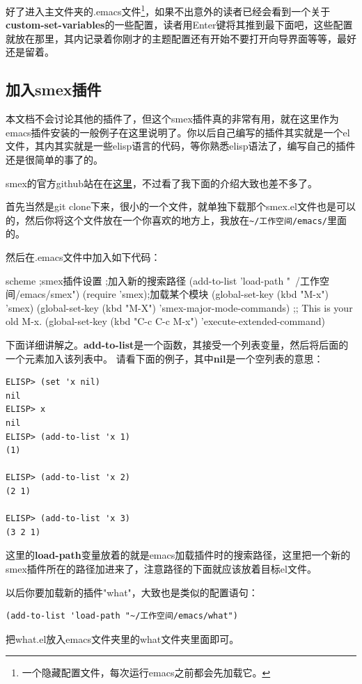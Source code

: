 \documentclass[11pt,oneside]{book}
\begin{document}
好了进入主文件夹的.emacs文件\footnote{一个隐藏配置文件，每次运行emacs之前都会先加载它。}，如果不出意外的读者已经会看到一个关于\textbf{custom-set-variables}的一些配置，读者用Enter键将其推到最下面吧，这些配置就放在那里，其内记录着你刚才的主题配置还有开始不要打开向导界面等等，最好还是留着。

\subsection{加入smex插件}
本文档不会讨论其他的插件了，但这个smex插件真的非常有用，就在这里作为emacs插件安装的一般例子在这里说明了。你以后自己编写的插件其实就是一个el文件，其内其实就是一些elisp语言的代码，等你熟悉elisp语法了，编写自己的插件还是很简单的事了的。

smex的官方github站在在\href{https://github.com/nonsequitur/smex/}{这里}，不过看了我下面的介绍大致也差不多了。

首先当然是git clone下来，很小的一个文件，就单独下载那个smex.el文件也是可以的，然后你将这个文件放在一个你喜欢的地方上，我放在\verb+~/工作空间/emacs/+里面的。

然后在.emacs文件中加入如下代码：
\begin{tcbcode}[]{scheme}
;smex插件设置
;加入新的搜索路径
(add-to-list 'load-path "~/工作空间/emacs/smex")
(require 'smex);加载某个模块
(global-set-key (kbd "M-x") 'smex)
(global-set-key (kbd "M-X") 'smex-major-mode-commands)
;; This is your old M-x.
(global-set-key (kbd "C-c C-c M-x") 'execute-extended-command)
\end{tcbcode}

下面详细讲解之。\textbf{add-to-list}是一个函数，其接受一个列表变量，然后将后面的一个元素加入该列表中。
请看下面的例子，其中\textbf{nil}是一个空列表的意思：
\begin{Verbatim}
ELISP> (set 'x nil)
nil
ELISP> x
nil
ELISP> (add-to-list 'x 1)
(1)

ELISP> (add-to-list 'x 2)
(2 1)

ELISP> (add-to-list 'x 3)
(3 2 1)
\end{Verbatim}

这里的\textbf{load-path}变量放着的就是emacs加载插件时的搜索路径，这里把一个新的smex插件所在的路径加进来了，注意路径的下面就应该放着目标el文件。

以后你要加载新的插件"what"，大致也是类似的配置语句：
\begin{Verbatim}
(add-to-list 'load-path "~/工作空间/emacs/what")
\end{Verbatim}
把what.el放入emacs文件夹里的what文件夹里面即可。
\end{document}
